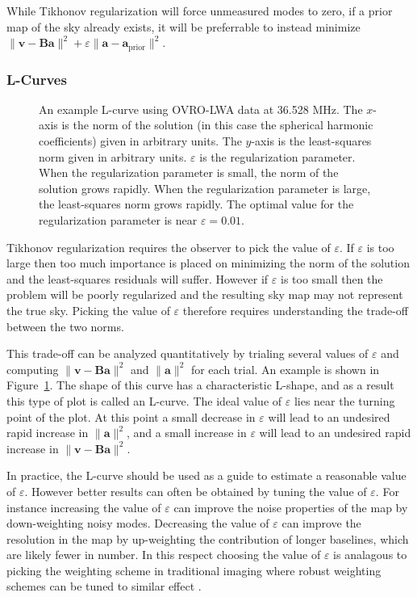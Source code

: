 \documentclass[twocolumn]{aastex61}
\renewcommand{\b}{\pmb}
\begin{document}
While Tikhonov regularization will force unmeasured modes to zero, if a prior map of the sky already
exists, it will be preferrable to instead minimize $\|\b v - \b B\b a\|^2 + \varepsilon \|\b a-\b
a_\text{prior}\|^2$.

\subsubsection{L-Curves}

\begin{figure}[t]
    \caption{
        An example L-curve using OVRO-LWA data at 36.528 MHz. The $x$-axis is the norm of the
        solution (in this case the spherical harmonic coefficients) given in arbitrary units. The
        $y$-axis is the least-squares norm given in arbitrary units. $\varepsilon$ is the
        regularization parameter. When the regularization parameter is small, the norm of the
        solution grows rapidly. When the regularization parameter is large, the least-squares norm
        grows rapidly. The optimal value for the regularization parameter is near
        $\varepsilon=0.01$.
    }
    \label{fig:lcurve}
\end{figure}

Tikhonov regularization requires the observer to pick the value of $\varepsilon$. If $\varepsilon$
is too large then too much importance is placed on minimizing the norm of the solution and the
least-squares residuals will suffer. However if $\varepsilon$ is too small then the problem will be
poorly regularized and the resulting sky map may not represent the true sky. Picking the value of
$\varepsilon$ therefore requires understanding the trade-off between the two norms.

This trade-off can be analyzed quantitatively by trialing several values of $\varepsilon$ and
computing $\|\b v - \b B\b a\|^2$ and $\|\b a\|^2$ for each trial. An example is shown in
Figure~\ref{fig:lcurve}. The shape of this curve has a characteristic L-shape, and as a result this
type of plot is called an L-curve. The ideal value of $\varepsilon$ lies near the turning point of
the plot. At this point a small decrease in $\varepsilon$ will lead to an undesired rapid increase
in $\|\b a\|^2$, and a small increase in $\varepsilon$ will lead to an undesired rapid increase in
$\|\b v - \b B\b a\|^2$.

In practice, the L-curve should be used as a guide to estimate a reasonable value of $\varepsilon$.
However better results can often be obtained by tuning the value of $\varepsilon$. For instance
increasing the value of $\varepsilon$ can improve the noise properties of the map by down-weighting
noisy modes. Decreasing the value of $\varepsilon$ can improve the resolution in the map by
up-weighting the contribution of longer baselines, which are likely fewer in number. In this respect
choosing the value of $\varepsilon$ is analagous to picking the weighting scheme in traditional
imaging where robust weighting schemes can be tuned to similar effect \citep{briggs}.
\end{document}
